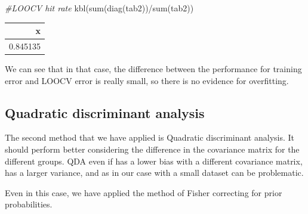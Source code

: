 \documentclass[
  11pt,
]{article}
\newenvironment{Shaded}{\begin{snugshade}}{\end{snugshade}}
\newcommand{\AttributeTok}[1]{\textcolor[rgb]{0.77,0.63,0.00}{#1}}
\newcommand{\CommentTok}[1]{\textcolor[rgb]{0.56,0.35,0.01}{\textit{#1}}}
\newcommand{\DecValTok}[1]{\textcolor[rgb]{0.00,0.00,0.81}{#1}}
\newcommand{\FunctionTok}[1]{\textcolor[rgb]{0.00,0.00,0.00}{#1}}
\newcommand{\NormalTok}[1]{#1}
\newcommand{\OtherTok}[1]{\textcolor[rgb]{0.56,0.35,0.01}{#1}}
\newcommand{\SpecialCharTok}[1]{\textcolor[rgb]{0.00,0.00,0.00}{#1}}
\begin{document}
\begin{Shaded}
\begin{Highlighting}[]
\CommentTok{\#LOOCV hit rate}
\FunctionTok{kbl}\NormalTok{(}\FunctionTok{sum}\NormalTok{(}\FunctionTok{diag}\NormalTok{(tab2))}\SpecialCharTok{/}\FunctionTok{sum}\NormalTok{(tab2))}
\end{Highlighting}
\end{Shaded}

\begin{tabular}[t]{r}
\hline
x\\
\hline
0.845135\\
\hline
\end{tabular}

We can see that in that case, the difference between the performance for training error and LOOCV error is really small, so there is no evidence for overfitting.

\hypertarget{quadratic-discriminant-analysis}{%
\subsection{Quadratic discriminant analysis}\label{quadratic-discriminant-analysis}}

The second method that we have applied is Quadratic discriminant analysis. It should perform better considering the difference in the covariance matrix for the different groups. QDA even if has a lower bias with a different covariance matrix, has a larger variance, and as in our case with a small dataset can be problematic.

Even in this case, we have applied the method of Fisher correcting for prior probabilities.

\begin{Shaded}
\end{Shaded}
\end{document}
